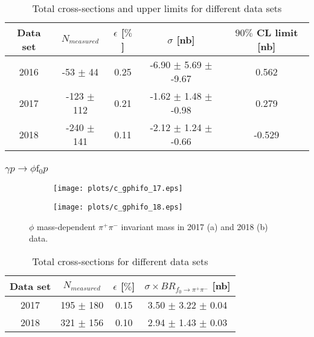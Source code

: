 \begin{table}[!htbp]
    \centering
    \caption{Total cross-sections and upper limits for different data sets}
    \label{tab.4.5.2}
    \begin{tabular}{|c|c|c|c|c|}
        \hline
        Data set & $N_{measured}$ & $\epsilon$ [$\%$] & $\sigma$ [nb] & $90\%$ CL limit [nb] \\
        \hline
        2016 &  -53 $\pm$ 44 & 0.25 & -6.90 $\pm$ 5.69 $\pm$ -9.67 & 0.562 \\
        \hline
        2017 & -123 $\pm$ 112 & 0.21 & -1.62 $\pm$ 1.48 $\pm$ -0.98 & 0.279 \\
        \hline
        2018 & -240 $\pm$ 141 & 0.11 & -2.12 $\pm$ 1.24 $\pm$ -0.66 & -0.529 \\
        \hline
    \end{tabular}
\end{table}

\subsubsection{\texorpdfstring{$\gamma p \rightarrow \phi \mathrm{f}_0 p$}{}}
\label{p.4.5.3}

\begin{figure}[H]
    \centering
    \begin{subfigure}[b]{0.45\textwidth}
        \texttt{[image: plots/c\_gphifo\_17.eps]}
        \caption{}
        \label{fig.4.5.3.1.a}
    \end{subfigure}
    \begin{subfigure}[b]{0.45\textwidth}
        \texttt{[image: plots/c\_gphifo\_18.eps]}
        \caption{}
        \label{fig.4.5.3.1.b}
    \end{subfigure}
    \caption{$\phi$ mass-dependent $\pi^+ \pi^-$ invariant mass in 2017 (a) and 2018 (b) data.}
    \label{fig:4.5.3.1}
\end{figure}

\begin{table}[!htbp]
    \centering
    \caption{Total cross-sections for different data sets}
    \label{tab.4.5.3}
    \begin{tabular}{|c|c|c|c|}
        \hline
        Data set & $N_{measured}$ & $\epsilon$ [$\%$] & $\sigma \times BR_{f_{0}\rightarrow\pi^{+}\pi^{-}}$ [nb] \\
        \hline
        2017 & 195 $\pm$ 180 & 0.15 & 3.50 $\pm$ 3.22 $\pm$ 0.04 \\
        \hline
        2018 & 321 $\pm$ 156 & 0.10 & 2.94 $\pm$ 1.43 $\pm$ 0.03 \\
        \hline
    \end{tabular}
\end{table}

